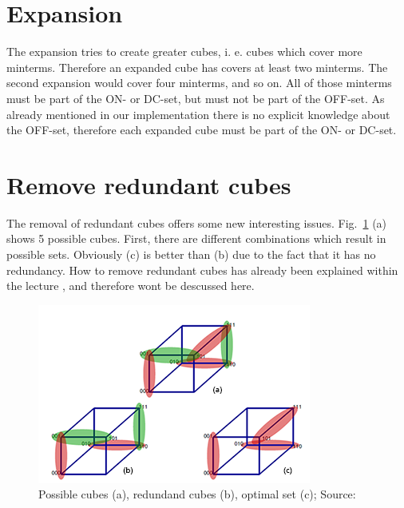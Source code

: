 \documentclass[colorback,accentcolor=tud1c,11pt]{tudreport}
\begin{document}
 \section{Expansion}
 The expansion tries to create greater cubes, i. e. cubes which cover more minterms. Therefore an expanded cube has covers at least two minterms. The second expansion would cover four minterms, and so on. All of those minterms must be part of the ON- or DC-set, but must not be part of the OFF-set. As already mentioned in our implementation there is no explicit knowledge about the OFF-set, therefore each expanded cube must be part of the ON- or DC-set.

 \section{Remove redundant cubes}
 The removal of redundant cubes offers some new interesting issues. Fig.~\ref{fig:redundancy} (a) shows 5 possible cubes. First, there are different combinations which result in possible sets. Obviously (c) is better than (b) due to the fact that it has no redundancy. How to remove redundant cubes has already been explained within the lecture \cite{Hochberger2017}, and therefore wont be descussed here.
 \begin{figure}
   \centering
   \includegraphics{redundancy}
   \caption{Possible cubes (a), redundand cubes (b), optimal set (c); Source: \cite{Hochberger2017}}
   \label{fig:redundancy}
 \end{figure}
\end{document}
